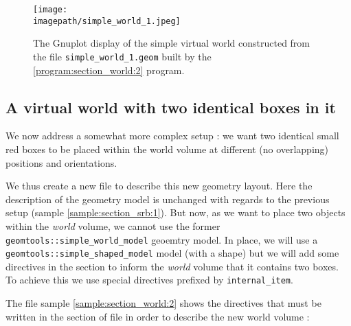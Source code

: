 \begin{figure}[h]
\begin{center}
\texttt{[image: \\imagepath/simple\_world\_1.jpeg]}
\end{center}
\caption{The Gnuplot  display of the simple  virtual world constructed
  from   the   file   \texttt{simple\_world\_1.geom}  built   by   the
  \ref{program:section_world:2}
  program.}\label{fig:mf:simple_world_1:a}
\end{figure}

\begin{sample}[hp]
\caption{The  GDML  file  generated  by  \ref{program:section_world:2}
  program from  the setup described  in the 
  file. Here a default list of  materials is added by the driver. In a
  practical  case, a  list of  materials  is inserted  by an  external
  software agent.}
\label{sample:gdml:1}
\end{sample}

\clearpage

\subsection{A virtual world with two identical boxes in it}

We now address  a somewhat more complex setup :  we want two identical
small  red boxes to  be placed  within the  world volume  at different
(no overlapping) positions and orientations.

We  thus create  a new   file  to describe  this new
geometry  layout.  Here  the description  of  the 
geometry model is unchanged with regards to the previous setup (sample
\ref{sample:section_srb:1}). But now, as  we want to place two objects
within   the   \emph{world}  volume,   we   cannot   use  the   former
\texttt{geomtools::simple\_world\_model} geoemtry model.  In place, we
will  use a  \texttt{geomtools::simple\_shaped\_model}  model (with  a
  shape) but  we will  add some  directives in  the 
section  to  inform  the  \emph{world}  volume that  it  contains  two
boxes.  To  achieve  this   we  use  special  directives  prefixed  by
\texttt{internal\_item}.

\pn The file  sample \ref{sample:section_world:2} shows the directives
that   must   be  written   in   the      section  of   file
 in order to describe the new world volume :
\begin{sample}
\caption{The \emph{world}
  section of the   file.}
\label{sample:section_world:2}
\end{sample}

